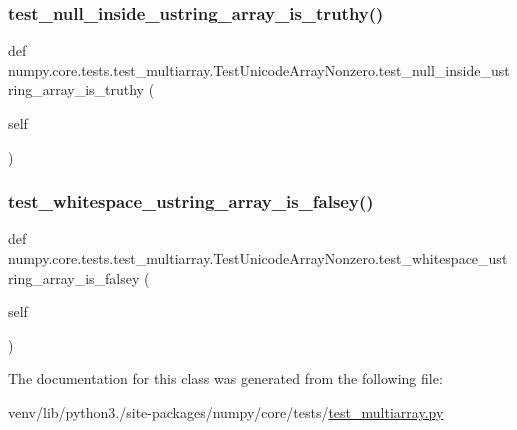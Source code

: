 \subsubsection{\texorpdfstring{test\+\_\+null\+\_\+inside\+\_\+ustring\+\_\+array\+\_\+is\+\_\+truthy()}{test\_null\_inside\_ustring\_array\_is\_truthy()}}
{\footnotesize\ttfamily def numpy.\+core.\+tests.\+test\+\_\+multiarray.\+Test\+Unicode\+Array\+Nonzero.\+test\+\_\+null\+\_\+inside\+\_\+ustring\+\_\+array\+\_\+is\+\_\+truthy (\begin{DoxyParamCaption}\item[{}]{self }\end{DoxyParamCaption})}

\mbox{\label{classnumpy_1_1core_1_1tests_1_1test__multiarray_1_1TestUnicodeArrayNonzero_afbefd38caf32164a0ed8ac42205dc0e6}} 
\subsubsection{\texorpdfstring{test\+\_\+whitespace\+\_\+ustring\+\_\+array\+\_\+is\+\_\+falsey()}{test\_whitespace\_ustring\_array\_is\_falsey()}}
{\footnotesize\ttfamily def numpy.\+core.\+tests.\+test\+\_\+multiarray.\+Test\+Unicode\+Array\+Nonzero.\+test\+\_\+whitespace\+\_\+ustring\+\_\+array\+\_\+is\+\_\+falsey (\begin{DoxyParamCaption}\item[{}]{self }\end{DoxyParamCaption})}



The documentation for this class was generated from the following file\+:\begin{DoxyCompactItemize}
\item 
venv/lib/python3./site-\/packages/numpy/core/tests/\hyperlink{core_2tests_2test__multiarray_8py}{test\+\_\+multiarray.\+py}\end{DoxyCompactItemize}
